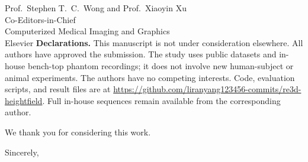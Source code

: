 \documentclass[12pt]{letter}
\begin{document}
\begin{letter}{Prof.\ Stephen T.\ C.\ Wong and Prof.\ Xiaoyin Xu\\
Co-Editors-in-Chief\\
Computerized Medical Imaging and Graphics\\
Elsevier}
\textbf{Declarations.}
This manuscript is not under consideration elsewhere. All authors have approved the submission. The study uses public datasets and in-house bench-top phantom recordings; it does not involve new human-subject or animal experiments. The authors have no competing interests. Code, evaluation scripts, and result files are at \url{https://github.com/liranyang123456-commits/re3d-heightfield}. Full in-house sequences remain available from the corresponding author.

We thank you for considering this work.

\closing{Sincerely,}

\end{letter}
\end{document}
